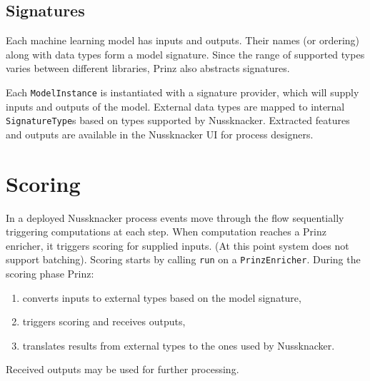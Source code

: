 \subsection{Signatures}

Each machine learning model has inputs and outputs.
Their names (or ordering) along with data types form a model signature.
Since the range of supported types varies between different libraries, Prinz also abstracts signatures.

Each \texttt{ModelInstance} is instantiated with a signature provider, which will supply inputs and outputs of the model.
External data types are mapped to internal \texttt{SignatureType}s based on types supported by Nussknacker.
Extracted features and outputs are available in the Nussknacker UI for process designers.

\section{Scoring}

In a deployed Nussknacker process events move through the flow sequentially triggering computations at each step.
When computation reaches a Prinz enricher, it triggers scoring for supplied inputs.
(At this point system does not support batching).
Scoring starts by calling \texttt{run} on a \texttt{PrinzEnricher}.
During the scoring phase Prinz:
\begin{enumerate}
	\item converts inputs to external types based on the model signature,
	\item triggers scoring and receives outputs,
	\item translates results from external types to the ones used by Nussknacker.
\end{enumerate}
Received outputs may be used for further processing.
